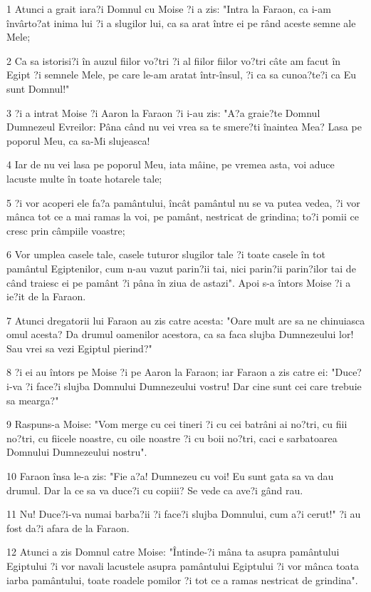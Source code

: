 \par 1 Atunci a grait iara?i Domnul cu Moise ?i a zis: "Intra la Faraon, ca i-am învârto?at inima lui ?i a slugilor lui, ca sa arat între ei pe rând aceste semne ale Mele;
\par 2 Ca sa istorisi?i în auzul fiilor vo?tri ?i al fiilor fiilor vo?tri câte am facut în Egipt ?i semnele Mele, pe care le-am aratat într-însul, ?i ca sa cunoa?te?i ca Eu sunt Domnul!"
\par 3 ?i a intrat Moise ?i Aaron la Faraon ?i i-au zis: "A?a graie?te Domnul Dumnezeul Evreilor: Pâna când nu vei vrea sa te smere?ti înaintea Mea? Lasa pe poporul Meu, ca sa-Mi slujeasca!
\par 4 Iar de nu vei lasa pe poporul Meu, iata mâine, pe vremea asta, voi aduce lacuste multe în toate hotarele tale;
\par 5 ?i vor acoperi ele fa?a pamântului, încât pamântul nu se va putea vedea, ?i vor mânca tot ce a mai ramas la voi, pe pamânt, nestricat de grindina; to?i pomii ce cresc prin câmpiile voastre;
\par 6 Vor umplea casele tale, casele tuturor slugilor tale ?i toate casele în tot pamântul Egiptenilor, cum n-au vazut parin?ii tai, nici parin?ii parin?ilor tai de când traiesc ei pe pamânt ?i pâna în ziua de astazi". Apoi s-a întors Moise ?i a ie?it de la Faraon.
\par 7 Atunci dregatorii lui Faraon au zis catre acesta: "Oare mult are sa ne chinuiasca omul acesta? Da drumul oamenilor acestora, ca sa faca slujba Dumnezeului lor! Sau vrei sa vezi Egiptul pierind?"
\par 8 ?i ei au întors pe Moise ?i pe Aaron la Faraon; iar Faraon a zis catre ei: "Duce?i-va ?i face?i slujba Domnului Dumnezeului vostru! Dar cine sunt cei care trebuie sa mearga?"
\par 9 Raspuns-a Moise: "Vom merge cu cei tineri ?i cu cei batrâni ai no?tri, cu fiii no?tri, cu fiicele noastre, cu oile noastre ?i cu boii no?tri, caci e sarbatoarea Domnului Dumnezeului nostru".
\par 10 Faraon însa le-a zis: "Fie a?a! Dumnezeu cu voi! Eu sunt gata sa va dau drumul. Dar la ce sa va duce?i cu copiii? Se vede ca ave?i gând rau.
\par 11 Nu! Duce?i-va numai barba?ii ?i face?i slujba Domnului, cum a?i cerut!" ?i au fost da?i afara de la Faraon.
\par 12 Atunci a zis Domnul catre Moise: "Întinde-?i mâna ta asupra pamântului Egiptului ?i vor navali lacustele asupra pamântului Egiptului ?i vor mânca toata iarba pamântului, toate roadele pomilor ?i tot ce a ramas nestricat de grindina".
